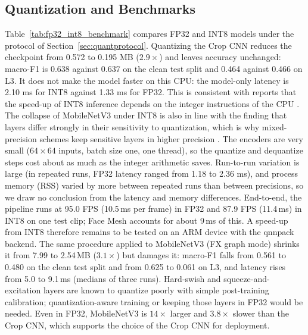 \documentclass[conference]{IEEEtran}
\begin{document}
\subsection{Quantization and Benchmarks}\label{sec:quant}
Table~\ref{tab:fp32_int8_benchmark} compares FP32 and INT8 models under the protocol of Section~\ref{sec:quantprotocol}. Quantizing the Crop CNN reduces the checkpoint from 0.572 to 0.195 MB ($2.9\times$) and leaves accuracy unchanged: macro-F1 is 0.638 against 0.637 on the clean test split and 0.464 against 0.466 on L3. It does not make the model faster on this CPU: the model-only latency is 2.10 ms for INT8 against 1.33 ms for FP32. This is consistent with reports that the speed-up of INT8 inference depends on the integer instructions of the CPU \cite{shin2026}. The collapse of MobileNetV3 under INT8 is also in line with the finding that layers differ strongly in their sensitivity to quantization, which is why mixed-precision schemes keep sensitive layers in higher precision \cite{ramp2026}. The encoders are very small ($64\times64$ inputs, batch size one, one thread), so the quantize and dequantize steps cost about as much as the integer arithmetic saves. Run-to-run variation is large (in repeated runs, FP32 latency ranged from 1.18 to 2.36 ms), and process memory (RSS) varied by more between repeated runs than between precisions, so we draw no conclusion from the latency and memory differences. End-to-end, the pipeline runs at 95.0 FPS (10.5\,ms per frame) in FP32 and 87.9 FPS (11.4\,ms) in INT8 on one test clip; Face Mesh accounts for about 9\,ms of this. A speed-up from INT8 therefore remains to be tested on an ARM device with the qnnpack backend. The same procedure applied to MobileNetV3 (FX graph mode) shrinks it from 7.99 to 2.54\,MB ($3.1\times$) but damages it: macro-F1 falls from 0.561 to 0.480 on the clean test split and from 0.625 to 0.061 on L3, and latency rises from 5.0 to 9.1\,ms (medians of three runs). Hard-swish and squeeze-and-excitation layers are known to quantize poorly with simple post-training calibration; quantization-aware training or keeping those layers in FP32 would be needed. Even in FP32, MobileNetV3 is $14\times$ larger and $3.8\times$ slower than the Crop CNN, which supports the choice of the Crop CNN for deployment.
\end{document}
